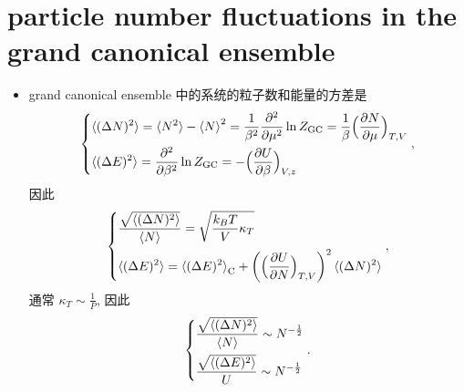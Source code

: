 \section{particle number fluctuations in the grand canonical ensemble}
\begin{itemize}
	\item grand canonical ensemble 中的系统的粒子数和能量的方差是
	\begin{equation}
		\begin{dcases}
			\braket{(\Delta N)^2} = \braket{N^2} - \braket{N}^2 = \frac{1}{\beta^2} \frac{\partial^2}{\partial \mu^2} \ln Z_\text{GC} = \frac{1}{\beta} \Big( \frac{\partial N}{\partial \mu} \Big)_{T, V} \\
			\braket{(\Delta E)^2} = \frac{\partial^2}{\partial \beta^2} \ln Z_\text{GC} = - \Big( \frac{\partial U}{\partial \beta} \Big)_{V, z}
		\end{dcases},
	\end{equation}
	因此
	\begin{equation} \label{4.4.2}
		\begin{dcases}
			\frac{\sqrt{\braket{(\Delta N)^2}}}{\braket{N}} = \sqrt{\frac{k_B T}{V} \kappa_T} \\
			\braket{(\Delta E)^2} = \braket{(\Delta E)^2}_\text{C} + \bigg( \Big( \frac{\partial U}{\partial N} \Big)_{T, V} \bigg)^2 \braket{(\Delta N)^2}
		\end{dcases},
	\end{equation}
	通常 $\kappa_T \sim \frac{1}{P}$, 因此
	\begin{equation}
		\begin{dcases}
			\frac{\sqrt{\braket{(\Delta N)^2}}}{\braket{N}} \sim N^{- \frac{1}{2}} \\
			\frac{\sqrt{\braket{(\Delta E)^2}}}{U} \sim N^{- \frac{1}{2}}
		\end{dcases}.
	\end{equation}
	

\end{itemize}
